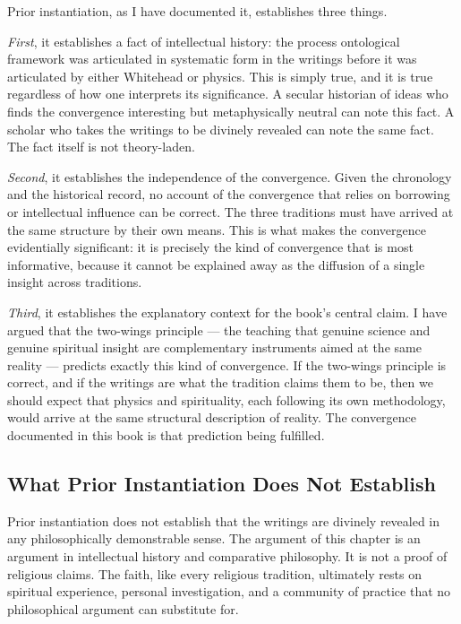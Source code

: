 Prior instantiation, as I have documented it, establishes three things.

\emph{First}, it establishes a fact of intellectual history: the process
ontological framework was articulated in systematic form in the \bahai writings
before it was articulated by either Whitehead or physics.
This is simply true, and it is true regardless of how one interprets its
significance.
A secular historian of ideas who finds the convergence interesting but
metaphysically neutral can note this fact.
A \bahai scholar who takes the writings to be divinely revealed can note the same
fact.
The fact itself is not theory-laden.

\emph{Second}, it establishes the independence of the convergence.
Given the chronology and the historical record, no account of the convergence
that relies on borrowing or intellectual influence can be correct.
The three traditions must have arrived at the same structure by their own means.
This is what makes the convergence evidentially significant: it is precisely the
kind of convergence that is most informative, because it cannot be explained away
as the diffusion of a single insight across traditions.

\emph{Third}, it establishes the explanatory context for the book's central claim.
I have argued that the two-wings principle --- the \bahai teaching that genuine
science and genuine spiritual insight are complementary instruments aimed at the
same reality --- predicts exactly this kind of convergence.
If the two-wings principle is correct, and if the \bahai writings are what the
tradition claims them to be, then we should expect that physics and \bahai
spirituality, each following its own methodology, would arrive at the same
structural description of reality.
The convergence documented in this book is that prediction being fulfilled.

\subsection*{What Prior Instantiation Does Not Establish}

Prior instantiation does not establish that the \bahai writings are divinely
revealed in any philosophically demonstrable sense.
The argument of this chapter is an argument in intellectual history and
comparative philosophy.
It is not a proof of religious claims.
The \bahai faith, like every religious tradition, ultimately rests on spiritual
experience, personal investigation, and a community of practice that no
philosophical argument can substitute for.

